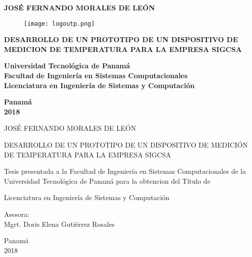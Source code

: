 \thispagestyle{empty}
\begin{center}
	
	\large
	
	\textbf{JOSÉ FERNANDO MORALES DE LEÓN}
	
	\vfill
	
	\begin{figure}[H]
		\centering
		\texttt{[image: logoutp.png]}
	\end{figure}

	\vfill
	
	\textbf{DESARROLLO DE UN PROTOTIPO DE UN DISPOSITIVO DE
	MEDICION DE TEMPERATURA PARA LA EMPRESA SIGCSA}
	
	\vfill
	
	\textbf{Universidad Tecnológica de Panamá \\
	Facultad de Ingeniería en Sistemas Computacionales \\
	Licenciatura en Ingeniería de Sistemas y Computación}
	
	\vfill
	
	\textbf{Panamá\\
	2018}
		
\end{center}
\clearpage

\thispagestyle{headings}
\mbox{}
\clearpage

\thispagestyle{empty}

\begin{center}

\large
JOSÉ FERNANDO MORALES DE LEÓN

\vfill

DESARROLLO DE UN PROTOTIPO DE UN DISPOSITIVO DE
MEDICIÓN DE TEMPERATURA PARA LA EMPRESA SIGCSA

\vfill

Tesis presentada a la Facultad de Ingeniería en Sistemas
Computacionales de la Universidad Tecnológica de Panamá
para la obtencion del Título de

\vfill

Licenciatura en Ingeniería de Sistemas y Computación

\vfill

Asesora:\\
Mgrt. Doris Elena Gutiérrez Rosales

\vfill
Panamá\\
2018

\end{center}

\clearpage

